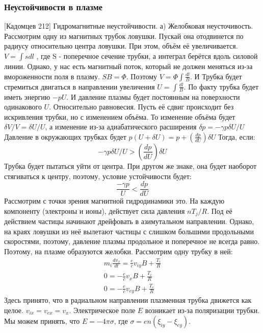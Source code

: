 \documentclass[10pt, a4paper]{article}
\begin{document}
\subsubsection{Неустойчивости в плазме}
\label{subsec:plasma_B_instabilities}
[Кадомцев 212]
Гидромагнитные неустойчивости.
а) Желобковая неусточивость.
Рассмотрим одну из магнитных трубок ловушки. Пускай она отодвинется по радиусу относительно центра ловушки. При этом, объём её увеличивается. $V=\int s dl$ , где S - поперечное сечение трубки, а интеграл берётся вдоль силовой линии. Однако, у нас есть магнитный поток, который не должен меняться из-за вмороженности поля в плазму. $SB=\Phi$. Поэтому $V=\Phi \int \frac{dl}{B}$. И Трубка будет стремиться двигаться в направлении увеличения $U=\int \frac{dl}{B}$. По факту трубка будет иметь энергию $-pU$. И давление плазмы будет постоянным на поверхности одинакового $U$.
Относительно равновесия. Пусть её сдвиг происходит без искривления трубки, но с изменением объёма. То изменение объёма будет $\delta V/V= \delta U/U$, а изменение из-за адиабатического расширения $\delta p = -\gamma p \delta U/U$ 
Давление в окружающих трубках будет $p(U+\delta U)=p+(\frac{dp}{dU}) \delta U$
Тогда, если:
\begin{equation}
	-\gamma p \delta U/U > (\frac{dp}{dU}) \delta U
\end{equation}
Трубка будет пытаться уйти от центра. При другом же знаке, она будет наоборот стягиваться к центру, поэтому, условие устойчивости будет:
\begin{equation}
	\frac{ -\gamma p}{U} < \frac{dp}{dU}
\end{equation}
Рассмотрим с точки зрения магнитной гидродинамики это. На каждую компоненту (электроны и ионы), действует сила давления $nT_j /R$. Под её действием частицы начинают дрейфовать в азимутальном направлении.
Однако, на краях ловушки из неё вылетают частицы с слишком большими продольными скоростями, поэтому, давление плазмы продольное и поперечное не всегда равно. Поэтому, на плазме образуются желобки. Рассмотрим одну трубку в ней:
\begin{align*}
	m_i \frac{d v_x}{dt}= \frac{e}{c} v_{iy} B + \frac{T_i}{R}\\
	0= -\frac{e}{c} v_{x} B + \frac{T_i}{R}\\
	0= -\frac{e}{c} v_{ey} B + \frac{T_e}{R}
\end{align*}
Здесь принято, что в радиальном направлении плазменная трубка движется как целое. $v_{ix}=v_{ex}=v_x$. Электрическое поле $E$ возникает из-за поляризации трубки. Мы можем принять, что $E=- 4 \pi \sigma$, где $\sigma=en(\xi_{iy} - \xi_{ey})$. 
\end{document}
